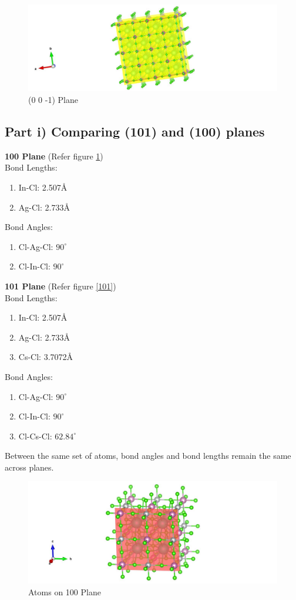 \documentclass{homework}
\begin{document}
\begin{figure}[ht]
\centering
\includegraphics[width=1\textwidth]{q1part_h6.jpg}
\caption{(0 0 -1) Plane}
\end{figure}
\FloatBarrier


\subsection*{Part i) Comparing (101) and (100) planes}
\textbf{100 Plane} (Refer figure \ref{100}) \\
Bond Lengths:
\begin{enumerate}
    \item In-Cl: 2.507\AA
    \item Ag-Cl: 2.733\AA
\end{enumerate}
Bond Angles:
\begin{enumerate}
    \item Cl-Ag-Cl: $90^{\circ}$
    \item Cl-In-Cl: $90^{\circ}$
\end{enumerate}
\textbf{101 Plane} (Refer figure \ref{101}) \\
Bond Lengths:
\begin{enumerate}
    \item In-Cl: 2.507\AA
    \item Ag-Cl: 2.733\AA
    \item Cs-Cl: 3.7072\AA
\end{enumerate}
Bond Angles:
\begin{enumerate}
    \item Cl-Ag-Cl: $90^{\circ}$
    \item Cl-In-Cl: $90^{\circ}$
    \item Cl-Cs-Cl: $62.84^{\circ}$
\end{enumerate}
Between the same set of atoms, bond angles and bond lengths remain the same across planes.
\begin{figure}[ht]
\centering
\includegraphics[width=1\textwidth]{q1part_i_100.jpg}
\caption{Atoms on 100 Plane}
\label{100}
\end{figure}
\end{document}
